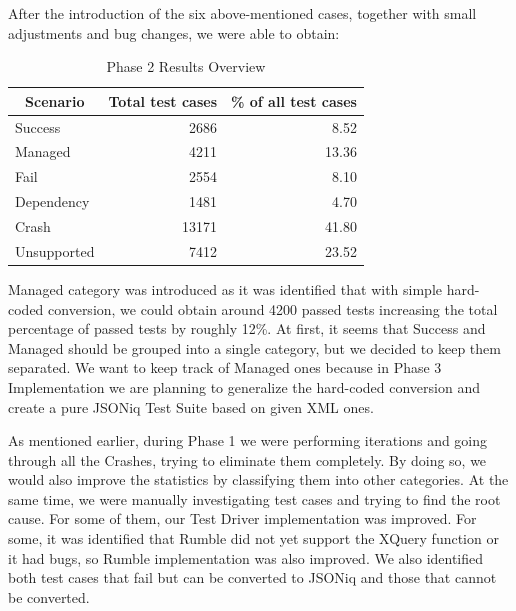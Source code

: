 After the introduction of the six above-mentioned cases, together with small adjustments and bug changes, we were able to obtain:
\begin{table}[h!]
	\centering
	\begin{tabular}{|l|r|r|}
		\hline
		\multicolumn{1}{|c|}{Scenario} & \multicolumn{1}{c|}{Total test cases} & \multicolumn{1}{c|}{\% of all test cases} \\ \hline
		Success                        & 2686                                  & 8.52                                      \\ \hline
		Managed                        & 4211                                  & 13.36                                     \\ \hline
		Fail                           & 2554                                  & 8.10                                      \\ \hline
		Dependency                     & 1481                                  & 4.70                                      \\ \hline
		Crash                          & 13171                                 & 41.80                                     \\ \hline
		Unsupported                    & 7412                                  & 23.52                                     \\ \hline
	\end{tabular}
	\caption{Phase 2 Results Overview}
	\label{tab:Phase2_ResultTable}
\end{table}

\vspace{-5mm}
Managed category was introduced as it was identified that with simple hard-coded conversion, we could obtain around 4200 passed tests increasing the total percentage of passed tests by roughly 12\%. At first, it seems that Success and Managed should be grouped into a single category, but we decided to keep them separated. We want to keep track of Managed ones because in Phase 3 Implementation we are planning to generalize the hard-coded conversion and create a pure JSONiq Test Suite based on given XML ones.

As mentioned earlier, during Phase 1 we were performing iterations and going through all the Crashes, trying to eliminate them completely. By doing so, we would also improve the statistics by classifying them into other categories. At the same time, we were manually investigating test cases and trying to find the root cause. For some of them, our Test Driver implementation was improved. For some, it was identified that Rumble did not yet support the XQuery function or it had bugs, so Rumble implementation was also improved. We also identified both test cases that fail but can be converted to JSONiq and those that cannot be converted.

